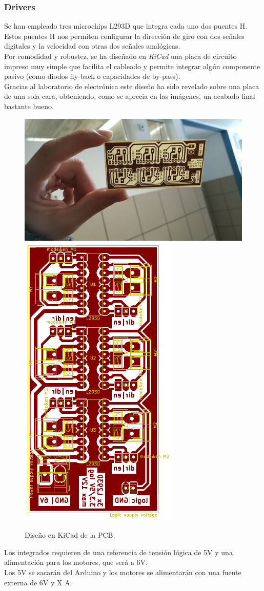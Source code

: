 \subsubsection{Drivers}
Se han empleado tres microchips L293D que integra cada uno dos puentes H. Estos puentes H nos permiten configurar la dirección de giro con dos señales digitales y la velocidad con otras dos señales analógicas.\\
Por comodidad y robustez, se ha diseñado en \textit{KiCad} una placa de circuito impreso muy simple que facilita el cableado y permite integrar algún 
componente pasivo (como diodos fly-back o capacidades de by-pass). \\
Gracias al laboratorio de electrónica este diseño ha sido revelado sobre una placa de una sola cara, obteniendo, como se aprecia en las imágenes, 
un acabado final bastante bueno.\\
 \begin{figure}[h!]
	 \centering
	 \includegraphics[width=.6\textwidth]{images/hw/pcb_img}
 	\includegraphics[width=.2\textwidth]{images/hw/pcb_kicad}
 	\caption{Diseño en KiCad de la PCB.}
 \end{figure}

 Los integrados requieren de una referencia de tensión lógica de 5V y una alimentación para los motores, que será a 6V. \\
Los 5V se sacarán del Arduino y los motores se alimentarán con una fuente externa de 6V y X A.

\newpage
